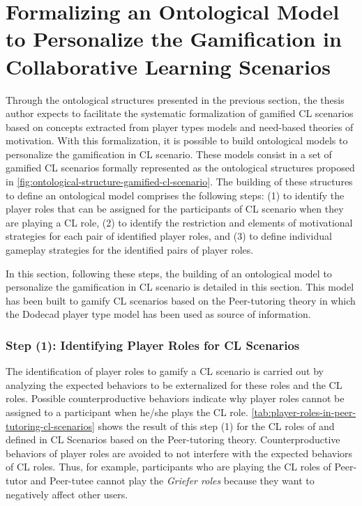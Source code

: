 
\section[Formalizing an Ontological Model to Personalize the Gamification in CL Scenarios]{Formalizing an Ontological Model to Personalize the Gamification in Collaborative Learning Scenarios}
\label{sec:formalizing-ontological-model}

Through the ontological structures presented in the previous section, the thesis author expects to facilitate the systematic formalization of gamified CL scenarios based on concepts extracted from player types models and need-based theories of motivation. With this formalization, it is possible to build ontological models to personalize the gamification in CL scenario.
These models consist in a set of gamified CL scenarios formally represented as the ontological structures proposed in \autoref{fig:ontological-structure-gamified-cl-scenario}.
The building of these structures to define an ontological model comprises the following steps:
(1) to identify the player roles that can be assigned for the participants of CL scenario when they are playing a CL role,
(2) to identify the restriction and elements of motivational strategies for each pair of identified player roles, and
(3) to define individual gameplay strategies for the identified pairs of player roles.

In this section, following these steps, the building of an ontological model to personalize the gamification in CL scenario is detailed in this section. This model has been built to gamify CL scenarios based on the Peer-tutoring theory \cite{Endlsey1980} in  which the Dodecad player type model\cite{Marczewski2017,Marczewski2015b} has been used as source of information. 

\subsubsection*{Step (1): Identifying Player Roles for CL Scenarios}  

The identification of player roles to gamify a CL scenario is carried out by analyzing the expected behaviors to be externalized for these roles and the CL roles.
Possible counterproductive behaviors indicate why player roles cannot be assigned to a participant when he/she plays the CL role.
\autoref{tab:player-roles-in-peer-tutoring-cl-scenarios} shows the result of this step (1) for the CL roles of  and  defined in CL Scenarios based on the Peer-tutoring theory.
Counterproductive behaviors of player roles are avoided to not interfere with the expected behaviors of CL roles.
Thus, for example, participants who are playing the CL roles of Peer-tutor and Peer-tutee cannot play the \emph{Griefer roles} because they want to negatively affect other users.

